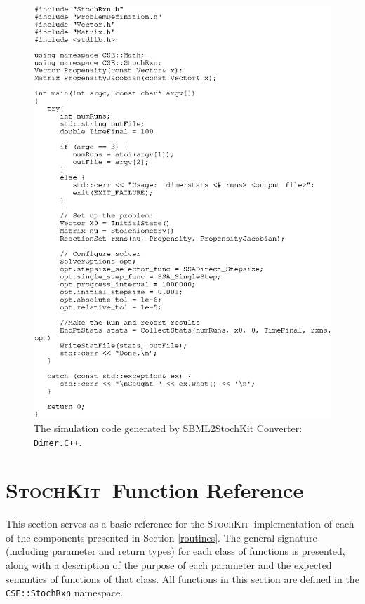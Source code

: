 \documentclass[12pt]{article}
\newcommand{\cpp}{\texttt{C++}}%
\newcommand{\api}[1]{\texttt{#1}}
\newcommand{\srccode}[1]{\texttt{#1}}
\newcommand{\sspack}{\textsc{StochKit}}
\begin{document}
\begin{figure}[htbp]
\centering \includegraphics{Dimer.eps}
\caption{The simulation code generated by SBML2StochKit Converter:
         \api{Dimer.\cpp}.}
\label{dimersimulation}
\end{figure}

\newpage

\appendix

\section{\sspack\ Function Reference}

This section serves as a basic reference for the \sspack\ implementation
of each of the components presented in Section
\ref{routines}. The general signature (including parameter
and return types) for each class of functions is presented, along with
a description of the purpose of each parameter and the expected
semantics of functions of that class.  All functions in this section
are defined in the \srccode{CSE::StochRxn} namespace.
\end{document}
